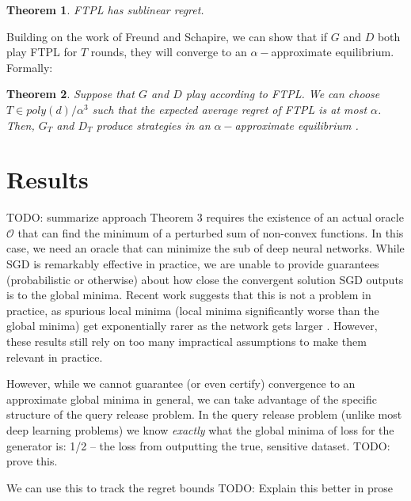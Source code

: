 \documentclass[]{article}
\newcommand{\todo}[1]{}
\renewcommand{\todo}[1]{{\color{red} TODO: {#1}}}
\newtheorem{theorem}{Theorem}
\begin{document}
\begin{theorem}
    FTPL has sublinear regret. \cite{AGH18}
\end{theorem}

Building on the work of Freund and Schapire, we can show that if $G$ and $D$ both play FTPL for $T$ rounds, they will converge to an $\alpha-$approximate equilibrium. Formally:

\begin{theorem}\label{ftpl-equilibriu}
    Suppose that $G$ and $D$ play according to FTPL. We can choose $T \in poly(d)/\alpha^3$ such that the expected average regret of FTPL is at most $\alpha$. Then, $G_T$ and $D_T$ produce strategies in an $\alpha-$approximate equilibrium \cite{AGH18}.
\end{theorem}

\section{Results}
\todo{summarize approach}
Theorem 3 requires the existence of an actual oracle $\mathcal{O}$ that can find the minimum of a perturbed sum of non-convex functions. In this case, we need an oracle that can minimize the sub of deep neural networks. While SGD is remarkably effective in practice, we are unable to provide guarantees (probabilistic or otherwise) about how close the convergent solution SGD outputs is to the global minima. Recent work suggests that this is not a problem in practice, as spurious local minima (local minima significantly worse than the global minima) get exponentially rarer as the network gets larger \cite{CHM+14}. However, these results still rely on too many impractical assumptions to make them relevant in practice. 

However, while we cannot guarantee (or even certify) convergence to an approximate global minima in general, we can take advantage of the specific structure of the query release problem. In the query release problem (unlike most deep learning problems) we know \emph{exactly} what the global minima of loss for the generator is: 1/2 -- the loss from outputting the true, sensitive dataset. \todo{prove this}.

We can use this to track the regret bounds \todo{Explain this better in prose}
\end{document}

